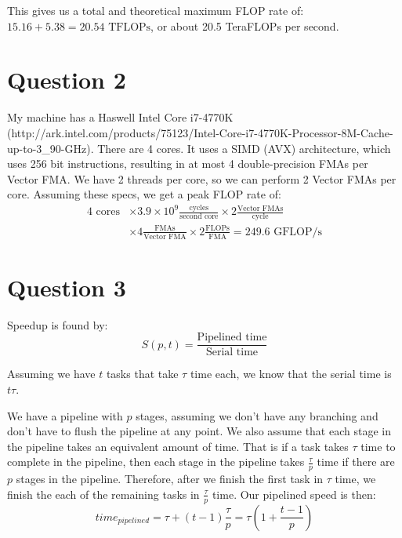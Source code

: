 \documentclass[11pt]{article}
\begin{document}
        This gives us a total and theoretical maximum FLOP rate of: $15.16 + 5.38 = 20.54 \text{ TFLOPs}$, or about 20.5 TeraFLOPs per second.

    \section*{Question 2}
        My machine has a Haswell Intel Core i7-4770K (http://ark.intel.com/products/75123/Intel-Core-i7-4770K-Processor-8M-Cache-up-to-3\_90-GHz). There are 4 cores. It uses a SIMD (AVX) architecture, which uses 256 bit instructions, resulting in at most 4 double-precision FMAs per Vector FMA. We have 2 threads per core, so we can perform 2 Vector FMAs per core. Assuming these specs, we get a peak FLOP rate of:
        \begin{align*}
            4 \text{ cores} &\times 3.9\times 10^9 \frac{\text{cycles}}{\text{second core}} \times 2 \frac{ \text{Vector FMAs} }{\text{cycle} }\\[0.5em]
                            &\times 4 \frac{ \text{FMAs}}{\text{Vector FMA}} \times 2 \frac{\text{FLOPs}}{\text{FMA}} = 249.6 \text{ GFLOP/s}
        \end{align*}

    \section*{Question 3}
        Speedup is found by:
        \begin{equation*}
            S(p, t) = \frac{\text{Pipelined time}}{\text{Serial time}}
        \end{equation*}

        Assuming we have $t$ tasks that take $\tau$ time each, we know that the serial time is $t\tau$.

        We have a pipeline with $p$ stages, assuming we don't have any branching and don't have to flush the pipeline at any point. We also assume that each stage in the pipeline takes an equivalent amount of time. That is if a task takes $\tau$ time to complete in the pipeline, then each stage in the pipeline takes $\frac{\tau}{p}$ time if there are $p$ stages in the pipeline. Therefore, after we finish the first task in $\tau$ time, we finish the each of the remaining tasks in $\frac{\tau}{p}$ time. Our pipelined speed is then:
        \begin{equation*}
            time_{pipelined} = \tau + (t - 1)\frac{\tau}{p} = \tau\left(1 + \frac{t - 1}{p}\right)
        \end{equation*}
\end{document}
